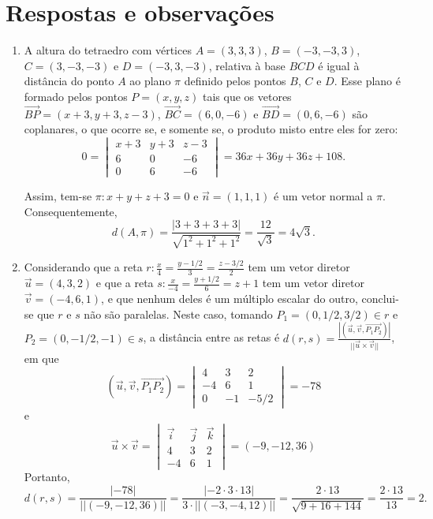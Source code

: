 \documentclass[12pt,a4paper]{article}
\newcommand{\vect}[1]{\overrightarrow{#1}}
\begin{document}
\section*{Respostas e observações}
\begin{enumerate}
\item A altura do tetraedro com vértices $A=(3,3,3)$, $B=(-3,-3,3)$, $C=(3,-3,-3)$ e $D=(-3,3,-3)$, relativa à base $BCD$ é igual à distância do ponto $A$ ao plano $\pi$ definido pelos pontos $B$, $C$ e $D$.
Esse plano é formado pelos pontos $P = (x,y,z)$ tais que os vetores $\vect{BP}=(x+3,y+3,z-3)$, $\vect{BC}=(6,0,-6)$ e $\vect{BD}=(0,6,-6)$ são coplanares, o que ocorre se, e somente se, o produto misto entre eles for zero:
\[
0=\begin{vmatrix}
x+3 & y+3 & z-3\\
  6 &   0 &  -6\\
  0 &   6 &  -6
\end{vmatrix}
= 36x+36y+36z+108.
\]

Assim, tem-se $\pi: x+y+z+3=0$ e $\vec{n}=(1,1,1)$ é um vetor normal a $\pi$. Consequentemente,
\[
d(A,\pi)
= \frac{|3+3+3+3|}{\sqrt{1^2+1^2+1^2}}
= \frac{12}{\sqrt{3}}
= 4 \sqrt{3}.
\]

\item Considerando que a reta $r: \frac{x}{4} = \frac{y-1/2}{3} = \frac{z-3/2}{2}$ tem um vetor diretor $\vec{u}=(4,3,2)$ e que a reta $s: \frac{x}{-4} = \frac{y+1/2}{6} = z+1$ tem um vetor diretor $\vec{v}=(-4,6,1)$, e que nenhum deles é um múltiplo escalar do outro, conclui-se que $r$ e $s$ não são paralelas. Neste caso, tomando $P_1 = (0,1/2,3/2) \in r$ e $P_2 = (0,-1/2,-1) \in s$, a distância entre as retas é $d(r, s)
= \frac{ \left| ( \vec{u}, \vec{v}, \vect{P_1P_2} ) \right| }
     { || \vec{u} \times \vec{v} || }
$, em que
\[
( \vec{u}, \vec{v}, \vect{P_1P_2} )
= \begin{vmatrix}
 4 &  3 &  2\\
-4 &  6 &  1\\
 0 & -1 & -5/2
\end{vmatrix}
=-78
\]
e
\[
\vec{u} \times \vec{v}
= \begin{vmatrix}
\vec{i} & \vec{j} & \vec{k}\\
 4 & 3 & 2\\
-4 & 6 & 1
\end{vmatrix}
=(-9, -12, 36)
\]
Portanto,
\[
d(r, s)
= \frac{ \left| -78 \right| }
     { || (-9, -12, 36) || }
= \frac{ \left| -2\cdot 3 \cdot 13 \right| }
     { 3 \cdot || (-3, -4, 12) || }
= \frac{ 2 \cdot 13 }
     { \sqrt{9+16+144} }
=
\frac{ 2 \cdot 13 }
     { 13 }
= 2.
\]


\end{enumerate}
\end{document}
